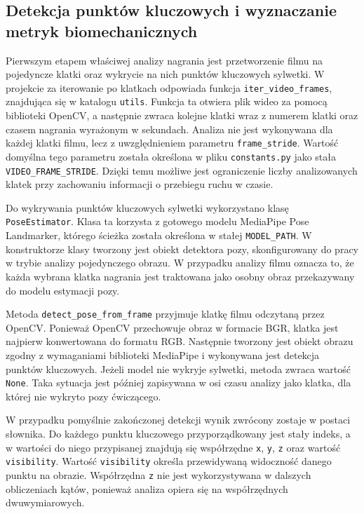 \subsection{Detekcja punktów kluczowych i wyznaczanie metryk biomechanicznych}

Pierwszym etapem właściwej analizy nagrania jest przetworzenie filmu na pojedyncze klatki oraz wykrycie na nich punktów kluczowych sylwetki. W projekcie za iterowanie po klatkach odpowiada funkcja \texttt{iter\_video\_frames}, znajdująca się w katalogu \texttt{utils}. Funkcja ta otwiera plik wideo za pomocą biblioteki OpenCV, a następnie zwraca kolejne klatki wraz z numerem klatki oraz czasem nagrania wyrażonym w sekundach. Analiza nie jest wykonywana dla każdej klatki filmu, lecz z uwzględnieniem parametru \texttt{frame\_stride}. Wartość domyślna tego parametru została określona w pliku \texttt{constants.py} jako stała \texttt{VIDEO\_FRAME\_STRIDE}. Dzięki temu możliwe jest ograniczenie liczby analizowanych klatek przy zachowaniu informacji o przebiegu ruchu w czasie.

Do wykrywania punktów kluczowych sylwetki wykorzystano klasę \texttt{PoseEstimator}. Klasa ta korzysta z gotowego modelu MediaPipe Pose Landmarker, którego ścieżka została określona w stałej \texttt{MODEL\_PATH}. W konstruktorze klasy tworzony jest obiekt detektora pozy, skonfigurowany do pracy w trybie analizy pojedynczego obrazu. W przypadku analizy filmu oznacza to, że każda wybrana klatka nagrania jest traktowana jako osobny obraz przekazywany do modelu estymacji pozy.

Metoda \texttt{detect\_pose\_from\_frame} przyjmuje klatkę filmu odczytaną przez OpenCV. Ponieważ OpenCV przechowuje obraz w formacie BGR, klatka jest najpierw konwertowana do formatu RGB. Następnie tworzony jest obiekt obrazu zgodny z wymaganiami biblioteki MediaPipe i wykonywana jest detekcja punktów kluczowych. Jeżeli model nie wykryje sylwetki, metoda zwraca wartość \texttt{None}. Taka sytuacja jest później zapisywana w osi czasu analizy jako klatka, dla której nie wykryto pozy ćwiczącego.

W przypadku pomyślnie zakończonej detekcji wynik zwrócony zostaje w postaci słownika. Do każdego punktu kluczowego przyporządkowany jest stały indeks, a w wartości do niego przypisanej znajdują się współrzędne \texttt{x}, \texttt{y}, \texttt{z} oraz wartość \texttt{visibility}. Wartość \texttt{visibility} określa przewidywaną widoczność danego punktu na obrazie. Współrzędna \texttt{z} nie jest wykorzystywana w dalszych obliczeniach kątów, ponieważ analiza opiera się na współrzędnych dwuwymiarowych.

